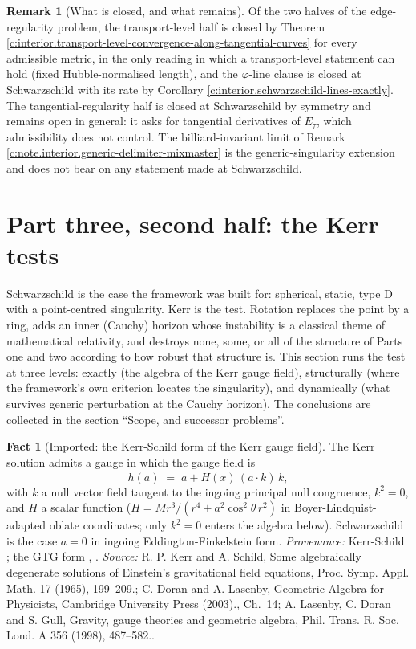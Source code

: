 \documentclass[11pt]{article}
\theoremstyle{definition}
\newtheorem{fact}[theorem]{Fact}
\newtheorem{remark}[theorem]{Remark}
\theoremstyle{plain}
\providecommand{\hb}{}\renewcommand{\hb}{\bar{h}}
\begin{document}
\begin{remark}[What is closed, and what remains]\label{c:note.interior.what-closed-what-remains}
Of the two halves of the edge-regularity problem, the transport-level half is closed by Theorem \ref{c:interior.transport-level-convergence-along-tangential-curves} for every admissible metric, in the only reading in which a transport-level statement can hold (fixed Hubble-normalised length), and the $\varphi$-line clause is closed at Schwarzschild with its rate by Corollary \ref{c:interior.schwarzschild-lines-exactly}. The tangential-regularity half is closed at Schwarzschild by symmetry and remains open in general: it asks for tangential derivatives of $E_{\tau}$, which admissibility does not control. The billiard-invariant limit of Remark \ref{c:note.interior.generic-delimiter-mixmaster} is the generic-singularity extension and does not bear on any statement made at Schwarzschild.
\end{remark}

\section{Part three, second half: the Kerr tests}

\label{c:note.interior.setting-part-three-second-half-kerr}
Schwarzschild is the case the framework was built for: spherical, static, type D with a point-centred singularity. Kerr is the test. Rotation replaces the point by a ring, adds an inner (Cauchy) horizon whose instability is a classical theme of mathematical relativity, and destroys none, some, or all of the structure of Parts one and two according to how robust that structure is. This section runs the test at three levels: exactly (the algebra of the Kerr gauge field), structurally (where the framework's own criterion locates the singularity), and dynamically (what survives generic perturbation at the Cauchy horizon). The conclusions are collected in the section ``Scope, and successor problems''.

\begin{fact}[Imported: the Kerr-Schild form of the Kerr gauge field]\label{c:interior.imported-kerr-schild-form-kerr-gauge}
The Kerr solution admits a gauge in which the gauge field is
\[
\hb(a) \;=\; a + H(x)\,(a\cdot k)\,k ,
\]
with $k$ a null vector field tangent to the ingoing principal null congruence, $k^2 = 0$, and $H$ a scalar function ($H = Mr^3/(r^4 + a^2\cos^2\theta\, r^2)$ in Boyer-Lindquist-adapted oblate coordinates; only $k^2 = 0$ enters the algebra below). Schwarzschild is the case $a = 0$ in ingoing Eddington-Finkelstein form. \emph{Provenance:} Kerr-Schild \cite{KerrSchild1965}; the GTG form \cite[Ch.~14]{DoranLasenby2003}, \cite{LDG1998}.
\emph{Source:} R. P. Kerr and A. Schild, Some algebraically degenerate solutions of Einstein's gravitational field equations, Proc. Symp. Appl. Math. 17 (1965), 199--209.; C. Doran and A. Lasenby, Geometric Algebra for Physicists, Cambridge University Press (2003)., Ch.~14; A. Lasenby, C. Doran and S. Gull, Gravity, gauge theories and geometric algebra, Phil. Trans. R. Soc. Lond. A 356 (1998), 487--582..
\end{fact}
\end{document}
